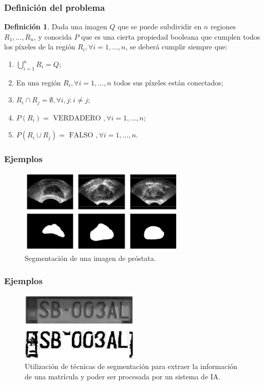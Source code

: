 \documentclass{beamer}
\theoremstyle{plain} %
\theoremstyle{definition}
\newtheorem{defn}{Definición}
\begin{document}
\begin{frame}
  \frametitle{Definición del problema}
  \begin{defn}\label{def:definicionproblema}
    Dada una imagen $Q$ que se puede subdividir en $n$ regiones $R_{1}, \dots, R_{n}$, y conocida $P$ que es una cierta propiedad booleana que cumplen todos los píxeles de la región $R_{i}, \forall  i=1,\dots ,n$, se deberá cumplir siempre que:
    \begin{enumerate}
      \item $\bigcup_{i=1}^{n}R_{i}=Q$;
      \item En una región $R_{i}, \forall i=1,\dots ,n$ todos sus píxeles están conectados;
      \item $R_{i}\cap R_{j}=\emptyset, \forall i, j : i\neq j;$
      \item $P(R_{i}) = \text{ VERDADERO }, \forall  i=1,\dots ,n;$
      \item $P(R_{i}\cup R_{j}) = \text{ FALSO }, \forall  i=1,\dots ,n.$
    \end{enumerate}
  \end{defn}
\end{frame}

\begin{frame}
  \frametitle{Ejemplos}
  \begin{figure}
    \centering
    \includegraphics[width=0.7\textwidth]{img/imagenmedica.eps}
    \caption{Segmentación de una imagen de próstata.}
    \label{img:segmentacionmedica}
  \end{figure}
\end{frame}

\begin{frame}
  \frametitle{Ejemplos}
  \begin{figure}
  \centering
    \includegraphics[width=0.5\textwidth]{img/matricula.eps}
    \caption{Utilización de técnicas de segmentación para extraer la información de una matrícula y poder ser procesada por un sistema de IA.}
    \label{img:matricula}
  \end{figure}
\end{frame}
\end{document}
